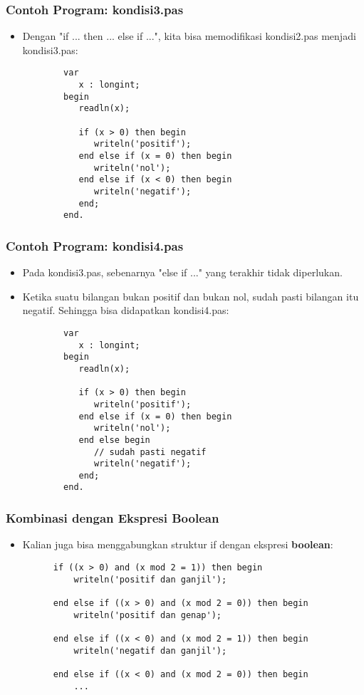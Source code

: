 \documentclass{beamer}
\begin{document}
\begin{frame}[fragile]
\frametitle{Contoh Program: kondisi3.pas}
\begin{itemize}
	\item Dengan "if ... then ... else if ...", kita bisa memodifikasi kondisi2.pas menjadi kondisi3.pas:
	\begin{lstlisting}
		var
		   x : longint;
		begin
		   readln(x);
		
		   if (x > 0) then begin
		      writeln('positif');
		   end else if (x = 0) then begin
		      writeln('nol');
		   end else if (x < 0) then begin
		      writeln('negatif');
		   end;
		end.
	\end{lstlisting}
\end{itemize}
\end{frame}

\begin{frame}[fragile]
\frametitle{Contoh Program: kondisi4.pas}
\begin{itemize}
	\item Pada kondisi3.pas, sebenarnya "else if ..." yang terakhir tidak diperlukan.
	\item Ketika suatu bilangan bukan positif dan bukan nol, sudah pasti bilangan itu negatif. Sehingga bisa didapatkan kondisi4.pas:
	\begin{lstlisting}
		var
		   x : longint;
		begin
		   readln(x);
		
		   if (x > 0) then begin
		      writeln('positif');
		   end else if (x = 0) then begin
		      writeln('nol');
		   end else begin
		      // sudah pasti negatif
		      writeln('negatif');
		   end;
		end.
	\end{lstlisting}
\end{itemize}
\end{frame}

\begin{frame}[fragile]
\frametitle{Kombinasi dengan Ekspresi Boolean}
\begin{itemize}
	\item Kalian juga bisa menggabungkan struktur if dengan ekspresi \textbf{boolean}:
	\begin{lstlisting}
	  if ((x > 0) and (x mod 2 = 1)) then begin
	      writeln('positif dan ganjil');
	      
	  end else if ((x > 0) and (x mod 2 = 0)) then begin
	      writeln('positif dan genap');
	      
	  end else if ((x < 0) and (x mod 2 = 1)) then begin
	      writeln('negatif dan ganjil');
	      
	  end else if ((x < 0) and (x mod 2 = 0)) then begin
 	      ...
	\end{lstlisting}
\end{itemize}
\end{frame}
\end{document}

